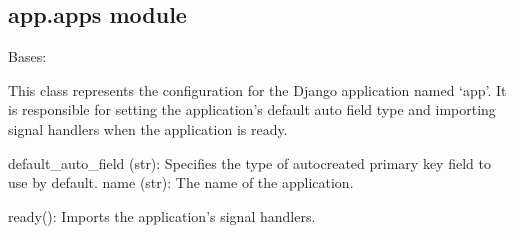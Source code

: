 \documentclass[letterpaper,10pt,english]{sphinxmanual}
\begin{document}
\subsection{app.apps module}
\label{\detokenize{app:module-app.apps}}\label{\detokenize{app:app-apps-module}}

\begin{fulllineitems}
\label{\detokenize{app:app.apps.AppConfig}}
\pysigstartsignatures
{}
\pysigstopsignatures
\sphinxAtStartPar
Bases: 

\sphinxAtStartPar
This class represents the configuration for the Django application named ‘app’.
It is responsible for setting the application’s default auto field type and 
importing signal handlers when the application is ready.
\begin{description}
\sphinxAtStartPar
default\_auto\_field (str): Specifies the type of auto\sphinxhyphen{}created primary key field to use by default.
name (str): The name of the application.

\sphinxAtStartPar
ready(): Imports the application’s signal handlers.

\end{description}

\begin{fulllineitems}
\label{\detokenize{app:app.apps.AppConfig.default_auto_field}}
\pysigstartsignatures
{}
\pysigstopsignatures
\end{fulllineitems}


\begin{fulllineitems}
\label{\detokenize{app:app.apps.AppConfig.name}}
\pysigstartsignatures
{}
\pysigstopsignatures
\end{fulllineitems}


\end{fulllineitems}
\end{document}
